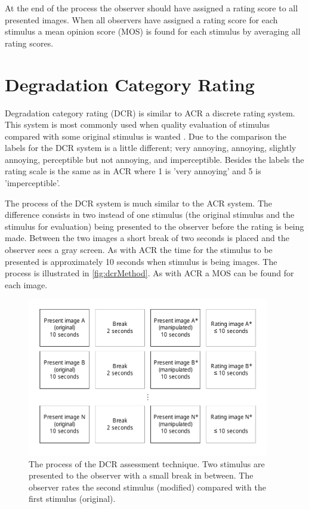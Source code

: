 At the end of the process the observer should have assigned a rating score to all presented images. When all observers have assigned a rating score for each stimulus a mean opinion score (MOS) is found for each stimulus by averaging all rating scores.


\section{Degradation Category Rating} %
\label{sec:dcr}

Degradation category rating (DCR) is similar to ACR a discrete rating system. This system is most commonly used when quality evaluation of stimulus compared with some original stimulus is wanted \cite{ITU-TRecommendationP.9102008}. Due to the comparison the labels for the DCR system is a little different; very annoying, annoying, slightly annoying, perceptible but not annoying, and imperceptible. Besides the labels the rating scale is the same as in ACR where 1 is 'very annoying' and 5 is 'imperceptible'.

The process of the DCR system is much similar to the ACR system. The difference consists in two instead of one stimulus (the original stimulus and the stimulus for evaluation) being presented to the observer before the rating is being made. Between the two images a short break of two seconds is placed and the observer sees a gray screen. As with ACR the time for the stimulus to be presented is approximately 10 seconds when stimulus is being images. The process is illustrated in \autoref{fig:dcrMethod}. As with ACR a MOS can be found for each image.

\begin{figure}[H]
	\centering
	\includegraphics[width = 300pt]{Img/DCR.pdf}
	\caption{The process of the DCR assessment technique. Two stimulus are presented to the observer with a small break in between. The observer rates the second stimulus (modified) compared with the first stimulus (original).}
	\label{fig:dcrMethod}
\end{figure}

